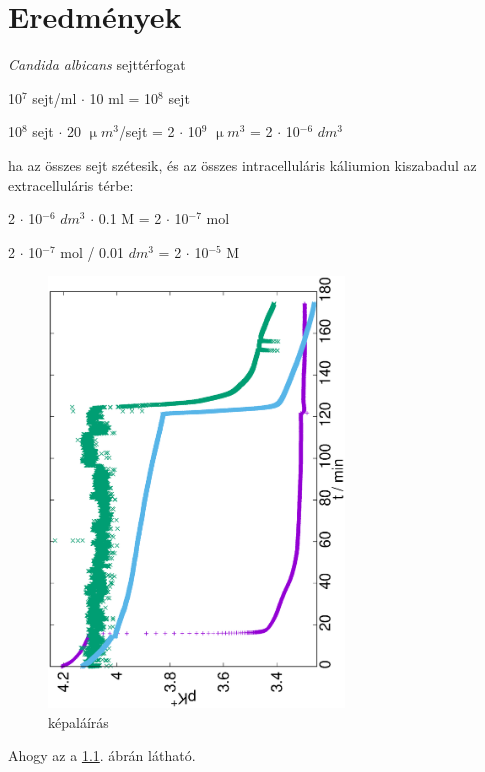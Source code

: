 \chapter{Eredmények}
\pagestyle{headings}

\emph{Candida albicans} sejttérfogat \cite{chaffin1984relationship}

10$^7$ sejt/ml $\cdot$ 10 ml = 10$^8$ sejt

10$^8$ sejt $\cdot$ 20 $\upmu m^3$/sejt = 2 $\cdot$ 10$^9$ $\upmu m^3$ = 2 $\cdot$ 10$^{-6}$ $dm^3$

ha az összes sejt szétesik, és az összes intracelluláris káliumion kiszabadul az extracelluláris térbe:

2 $\cdot$ 10$^{-6}$ $dm^3$ $\cdot$ 0.1 M = 2 $\cdot$ 10$^{-7}$ mol

2 $\cdot$ 10$^{-7}$ mol / 0.01 $dm^3$ = 2 $\cdot$ 10$^{-5}$ M

\begin{figure}
\centering
\includegraphics[width=0.7\textwidth, angle=-90]{img/mérés.eps}
\caption{képaláírás}
\label{fig:mérések}
\end{figure}

Ahogy az a \ref{fig:mérések}. ábrán látható.


